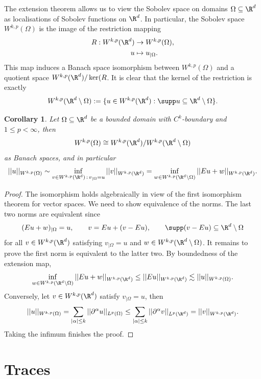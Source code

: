\documentclass[reqno]{amsart}
\newtheorem{corollary}[theorem]{Corollary}
\theoremstyle{definition}
\theoremstyle{remark}
\begin{document}
The extension theorem allows us to view the Sobolev space on domains $\Omega \subseteq \R^d$ as localisations of Sobolev functions on $\R^d$. In particular, the Sobolev space $W^{k, p} (\Omega)$ is the image of the restriction mapping 
	\begin{align*}
		R: W^{k, p} (\R^d) 
			&\to W^{k, p} (\Omega),\\
		u
			&\mapsto u_{|\Omega}.	
	\end{align*}
This map induces a Banach space isomorphism between $W^{k, p} (\Omega)$ and a quotient space $W^{k, p} (\R^d)/\ker (R$. It is clear that the kernel of the restriction is exactly 
	\[  W^{k, p} (\R^d \setminus \Omega) := \{ u \in W^{k, p} (\R^d) : \supp u \subseteq \R^d \setminus \Omega \}. \]

\begin{corollary}
	Let $\Omega \subseteq \R^d$ be a bounded domain with $C^k$-boundary and $1 \leq p < \infty$, then 
		\[ W^{k, p} (\Omega) \cong W^{k, p} (\R^d) / W^{k, p} (\R^d \setminus \Omega) \]
	as Banach spaces, and in particular
		\[ ||u||_{W^{k, p} (\Omega)} \sim \inf_{v \in W^{k, p} (\R^d) \, : \, v_{|\Omega} = u} ||v||_{W^{k, p} (\R^d)} = \inf_{w \in W^{k, p} (\R^d \setminus \Omega)} || Eu + w ||_{W^{k, p} (\R^d)} . \]	
\end{corollary}

\begin{proof}
	The isomorphism holds algebraically in view of the first isomorphism theorem for vector spaces. We need to show equivalence of the norms. The last two norms are equivalent since 
		\[ (Eu + w)_{|\Omega} = u, \qquad v = Eu + (v - Eu), \qquad \supp (v - Eu) \subseteq \R^d \setminus \Omega \] 
	for all $v \in W^{k, p} (\R^d)$ satisfying $v_{|\Omega} = u$ and $w \in W^{k, p} (\R^d \setminus \Omega)$. It remains to prove the first norm is equivalent to the latter two. By boundedness of the extension map, 
		\[ \inf_{w \in W^{k, p} (\R^d \setminus \Omega)} ||Eu + w||_{W^{k, p} (\R^d)} \leq ||Eu||_{W^{k, p} (\R^d)} \lesssim ||u||_{W^{k, p} (\Omega)} .\]
	Conversely, let $v \in W^{k, p} (\R^d)$ satisfy $v_{|\Omega} = u$, then 
		\[ ||u||_{W^{k, p} (\Omega)} = \sum_{|\alpha| \leq k} ||\partial^\alpha u||_{L^p (\Omega)} \leq  \sum_{|\alpha| \leq k} ||\partial^\alpha v||_{L^p (\R^d)} = ||v||_{W^{k, p} (\R^d)}.  \]
	Taking the infimum finishes the proof. 		
\end{proof}

\section{Traces}
\end{document}
